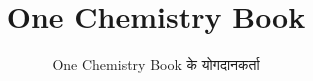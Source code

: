 \documentclass[11pt,a4paper,twoside,openany]{book}
\title{One Chemistry Book}
\author{One Chemistry Book के योगदानकर्ता}
\date{\bookdate}
\begin{document}
\frontmatter




\tableofcontents

\mainmatter



\appendix
\part{\omsolutionspart}


\backmatter
\renewcommand{\indexspace}{\par\vskip 8pt plus 4pt minus 4pt\relax}
\printindex
\end{document}
